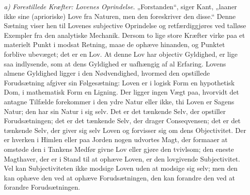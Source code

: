 \documentclass[12pt,a4paper]{book}
\newcommand{\runin}[1]{\emph{#1}\hspace{0.4em}}
\begin{document}
\runin{a) Forestillede Kræfter: Lovenes Oprindelse.}%
„Forstanden“, siger Kant, „laaner ikke sine (aprioriske) Love fra
Naturen, men den foreskriver den disse.“ Denne Sætning viser hen til
Lovenes subjective Oprindelse og retfærdiggjøres ved talløse Exempler
fra den analytiske Mechanik. Dersom to lige store Kræfter virke paa et
materielt Punkt i modsat Retning, maae de ophæve hinanden, og Punktet
forblive ubevæget; det er en Lov. At denne Lov har objectiv Gyldighed,
er lige saa indlysende, som at dens Gyldighed er uafhængig af al
Erfaring. Lovens almene Gyldighed ligger i den Nødvendighed, hvormed den
opstillede Forudsætning afgiver sin Følgesætning: Loven er i logisk Form en
hypothetisk Dom, i mathematisk Form en Ligning. Der ligger ingen Vægt
paa, hvorvidt det antagne Tilfælde forekommer i den ydre Natur eller
ikke, thi Loven er Sagens Natur; den har sin Natur i sig selv. Det er
det tænkende Selv, der opstiller Forudsætningen; det er det tænkende
Selv, der drager Conseqvensen; det er det tænkende Selv, der giver sig
selv Loven og forvisser sig om dens Objectivitet. Der er hverken i
Himlen eller paa Jorden nogen udvortes Magt, der formaaer at omstøde den
i Tankens Medfør givne Lov eller gjøre den tvivlsom; den eneste
Magthaver, der er i Stand til at ophæve Loven, er den lovgivende
Subjectivitet. Vel kan Subjectiviteten ikke modsige Loven uden at
modsige sig selv; men den kan ophæve den ved at ophæve Forudsætningen,
den kan forandre den ved at forandre Forudsætningen.
\end{document}
